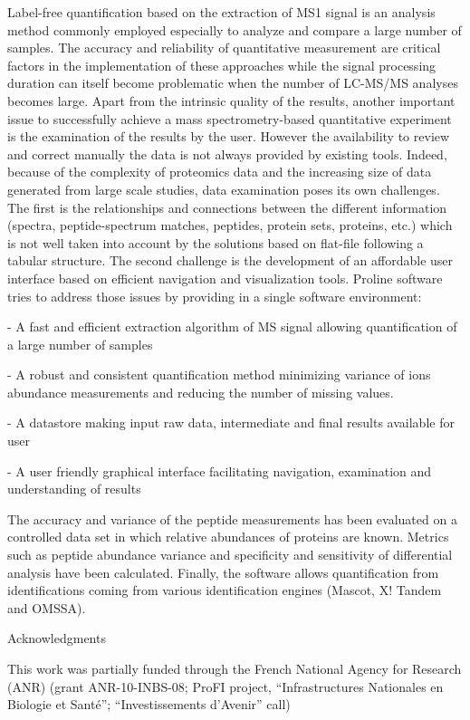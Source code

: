 Label-free quantification based on the extraction of MS1 signal is an analysis method commonly employed especially to analyze and compare a large number of samples. The accuracy and reliability of quantitative measurement are critical factors in the implementation of these approaches while the signal processing duration can itself become problematic when the number of LC-MS/MS analyses becomes large. Apart from the intrinsic quality of the results, another important issue to successfully achieve a mass spectrometry-based quantitative experiment is the examination of the results by the user. However the availability to review and correct manually the data is not always provided by existing tools. Indeed, because of the complexity of proteomics data and the increasing size of data generated from large scale studies, data examination poses its own challenges. The first is the relationships and connections between the different information (spectra, peptide-spectrum matches, peptides, protein sets, proteins, etc.) which is not well taken into account by the solutions based on flat-file following a tabular structure. The second challenge is the development of an affordable user interface based on efficient navigation and visualization tools. Proline software tries to address those issues by providing in a single software environment:

- A fast and efficient extraction algorithm of MS signal allowing quantification of a large number of samples

- A robust and consistent quantification method minimizing variance of ions abundance measurements and reducing the number of missing values.

- A datastore making input raw data, intermediate and final results available for user

- A user friendly graphical interface facilitating navigation, examination and understanding of results

The accuracy and variance of the peptide measurements has been evaluated on a controlled data set in which relative abundances of proteins are known. Metrics such as peptide abundance variance and specificity and sensitivity of differential analysis have been calculated. Finally, the software allows quantification from identifications coming from various identification engines (Mascot, X! Tandem and OMSSA).

Acknowledgments

This work was partially funded through the French National Agency for Research (ANR) (grant ANR-10-INBS-08; ProFI project, “Infrastructures Nationales en Biologie et Santé”; “Investissements d’Avenir” call)

